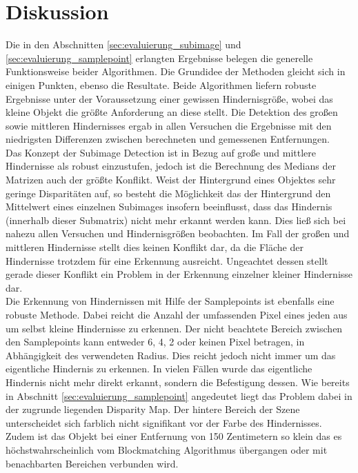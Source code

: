 \section{Diskussion}
\label{sec:evaluation_Diskussion}

Die in den Abschnitten \ref{sec:evaluierung_subimage} und \ref{sec:evaluierung_samplepoint} erlangten Ergebnisse belegen die generelle Funktionsweise beider Algorithmen. Die Grundidee der Methoden gleicht sich in einigen Punkten, ebenso die Resultate. Beide Algorithmen liefern robuste Ergebnisse unter der Voraussetzung einer gewissen Hindernisgröße, wobei das kleine Objekt die größte Anforderung an diese stellt. Die Detektion des großen sowie mittleren Hindernisses ergab in allen Versuchen die Ergebnisse mit den niedrigsten Differenzen zwischen berechneten und gemessenen Entfernungen.\\

\noindent
Das Konzept der Subimage Detection ist in Bezug auf große und mittlere Hindernisse als robust einzustufen, jedoch ist die Berechnung des Medians der Matrizen auch der größte Konflikt. Weist der Hintergrund eines Objektes sehr geringe Disparitäten auf, so besteht die Möglichkeit das der Hintergrund den Mittelwert eines einzelnen Subimages insofern beeinflusst, dass das Hindernis (innerhalb dieser Submatrix) nicht mehr erkannt werden kann. Dies ließ sich bei nahezu allen Versuchen und Hindernisgrößen beobachten. Im Fall der großen und mittleren Hindernisse stellt dies keinen Konflikt dar, da die Fläche der Hindernisse trotzdem für eine Erkennung ausreicht. Ungeachtet dessen stellt gerade dieser Konflikt ein Problem in der Erkennung einzelner kleiner Hindernisse dar.\\

\noindent
Die Erkennung von Hindernissen mit Hilfe der Samplepoints ist ebenfalls eine robuste Methode. Dabei reicht die Anzahl der umfassenden Pixel eines jeden aus um selbst kleine Hindernisse zu erkennen. Der nicht beachtete Bereich zwischen den Samplepoints kann entweder 6, 4, 2 oder keinen Pixel betragen, in Abhängigkeit des verwendeten Radius. Dies reicht jedoch nicht immer um das eigentliche Hindernis zu erkennen. In vielen Fällen wurde das eigentliche Hindernis nicht mehr direkt erkannt, sondern die Befestigung dessen. Wie bereits in Abschnitt \ref{sec:evaluierung_samplepoint} angedeutet liegt das Problem dabei in der zugrunde liegenden Disparity Map. Der hintere Bereich der Szene unterscheidet sich farblich nicht signifikant vor der Farbe des Hindernisses. Zudem ist das Objekt bei einer Entfernung von 150 Zentimetern so klein das es höchstwahrscheinlich vom Blockmatching Algorithmus übergangen oder mit benachbarten Bereichen verbunden wird.\\

